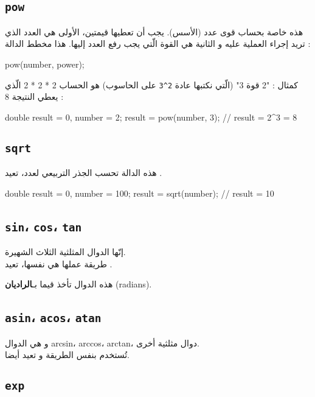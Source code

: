 \subsection{\texttt{pow}}

هذه خاصة بحساب قوى عدد (الأسس). يجب أن تعطيها قيمتين، الأولى هي العدد الذي تريد إجراء العملية عليه و الثانية هي القوة الّتي يجب رفع العدد إليها. هذا مخطط الدالة :

\begin{Csource}
pow(number, power);
\end{Csource}

كمثال : "2 قوة 3" (الّتي نكتبها عادة
\texttt{2\^{}3}
على الحاسوب) هو الحساب
2 * 2 * 2
الّذي يعطي النتيجة 8 :

\begin{Csource}
double result = 0, number = 2;
result = pow(number, 3); // result = 2^3 = 8
\end{Csource}

\subsection{\texttt{sqrt}}

هذه الدالة تحسب الجذر التربيعي لعدد، تعيد
.

\begin{Csource}
double result = 0, number = 100;
result = sqrt(number); // result = 10
\end{Csource}

\subsection{\texttt{sin}، \texttt{cos}، \texttt{tan}}

إنّها الدوال المثلثية الثلاث الشهيرة.\\
طريقة عملها هي نفسها، تعيد
.

هذه الدوال تأخذ قيما بـ\textbf{الراديان}
(\textenglish{radians}).

\subsection{\texttt{asin}، \texttt{acos}، \texttt{atan}}

و هي الدوال
\textenglish{arcsin}، \textenglish{arccos}، \textenglish{arctan}،
دوال مثلثية أخرى.\\
تُستخدم بنفس الطريقة و تعيد
أيضا.

\subsection{\texttt{exp}}

